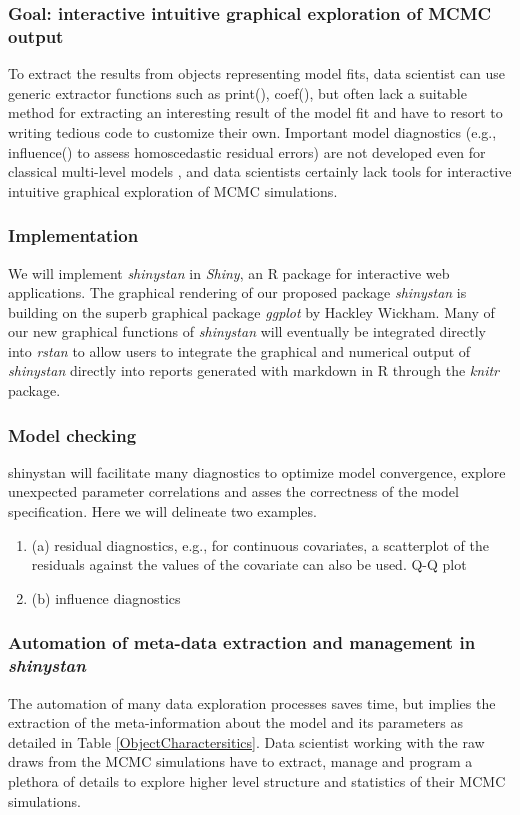 \documentclass[11pt,notitlepage]{article}
\begin{document}
\subsubsection*{Goal: interactive intuitive graphical exploration of MCMC output} 
To extract the results from objects representing model fits, data scientist can 
use generic extractor functions such as print(), coef(), but often lack a suitable 
method for extracting an interesting result of the model fit and have to resort to 
writing tedious code to customize their own. Important model diagnostics 
(e.g., influence() to assess  homoscedastic residual errors) are not 
developed even for classical multi-level models \cite{Galecki2013linear}, 
and data scientists certainly lack tools for interactive intuitive graphical 
exploration of MCMC simulations.

\subsubsection*{Implementation}
We will implement \textit{shinystan} in \textit{Shiny}, an R package for interactive 
web applications. The graphical rendering of our proposed package \textit{shinystan} 
is building on the superb graphical package \textit{ggplot} by Hackley Wickham. 
Many of our new graphical functions of \textit{shinystan} will eventually be 
integrated directly into \textit{rstan} to allow users to integrate the graphical 
and numerical output of \textit{shinystan} directly into reports generated with 
markdown in R through the \textit{knitr} package.

\subsubsection*{Model checking}
shinystan will facilitate many diagnostics to optimize model convergence, explore unexpected parameter correlations and asses the correctness of the model specification. Here we will delineate two examples.
\begin{enumerate}
\item (a) residual diagnostics, e.g., for continuous covariates, a scatterplot of the residuals against the values of the covariate can also be used. Q-Q plot
 
\item (b) influence diagnostics
\end{enumerate}

\subsubsection*{Automation of meta-data extraction and management in \textit{shinystan}}
The automation of many data exploration processes saves time, but implies the extraction of the meta-information about the model and its parameters as detailed in Table \ref{ObjectCharactersitics}. Data scientist working with the raw draws from the MCMC simulations have to extract, manage and program a plethora of details to explore higher level structure and statistics of their MCMC simulations. 
\end{document}
